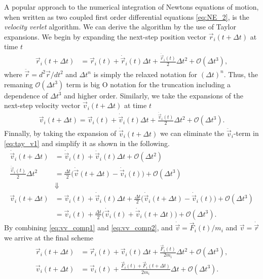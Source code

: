 A popular approach to the numerical integration of Newtons equations of motion, when written as two coupled first order differential equations \cref{eq:NE_2}, is the \textit{velocity verlet} algorithm. We can derive the algorithm by
the use of Taylor expansions. We begin by expanding the next-step position
vector $\vec{r}_i(t + \Delta t)$ at time $t$
\begin{align}
  \vec{r}_i(t + \Delta t) &= \vec{r}_i(t) + \dot{\vec{r}}_i(t) \Delta t + \frac{\ddot{\vec{r}}_i(t)}{2} \Delta t^2 + \mathcal{O}(\Delta t^3) \label{eq:vv_comp1},
\end{align}
where $\ddot{\vec{r}} = d^2\vec{r}/dt^2$ and $\Delta t^n$ is simply the relaxed
notation for $(\Delta t)^n$. Thus, the remaning $\mathcal{O}(\Delta t^3)$ term is big O notation for the truncation including a dependence of $\Delta t^3$ and higher order. Similarly, we take the expansions of the next-step
velocity vector $\vec{v}_i(t+\Delta t)$ at time $t$ 
\begin{align}
  \vec{v}_i(t+\Delta t) = \vec{v}_i(t) + \dot{\vec{v}}_i(t) \Delta t + \frac{\ddot{\vec{v}}_i(t)}{2}\Delta t^2 + \mathcal{O}(\Delta t^3).
  \label{eq:tay_v1}
\end{align}
Finnally, by taking the expansion of $\dot{\vec{v}}_i(t+\Delta t)$ we can
eliminate the $\ddot{\vec{v}}_i$-term in \cref{eq:tay_v1} and simplify it as
shown in the following.
\begin{align}
  \dot{\vec{v}}_i(t+\Delta t) &= \dot{\vec{v}}_i(t) + \ddot{\vec{v}}_i(t) \Delta t + \mathcal{O}(\Delta t^2) \nonumber \\
  \frac{\ddot{\vec{v}}_i(t)}{2}\Delta t^2 &= \frac{\Delta t}{2}\Big( \dot{\vec{v}}(t+\Delta t) - \dot{\vec{v}}_i(t)\Big) + \mathcal{O}(\Delta t^3) \nonumber \\
  &\Downarrow \nonumber \\
  \vec{v}_i(t+\Delta t) &= \vec{v}_i(t) + \dot{\vec{v}}_i(t) \Delta t + \frac{\Delta t}{2}\Big( \dot{\vec{v}}_i(t+\Delta t) - \dot{\vec{v}}_i(t)\Big) + \mathcal{O}(\Delta t^3) \nonumber \\
  &=  \vec{v}_i(t) + \frac{\Delta t}{2}\Big( \dot{\vec{v}}_i(t) +  \dot{\vec{v}}_i(t+\Delta t)\Big) + \mathcal{O}(\Delta t^3).
  \label{eq:vv_comp2}
\end{align}
By combining \cref{eq:vv_comp1} and \cref{eq:vv_comp2}, and $\dot{\vec{v}} = \vec{F}_i(t)/m_i$ and $\vec{v} = \dot{\vec{r}}$ we
arrive at the final scheme
\begin{align*}
  \vec{r}_i(t + \Delta t) &= \vec{r}_i(t) + \vec{v}_i(t) \Delta t + \frac{\vec{F}_i(t)}{2m_i}\Delta t^2 + \mathcal{O}(\Delta t^3), \\
  \vec{v}_i(t+\Delta t)  &= \vec{v}_i(t) + \frac{\vec{F}_i(t) + \vec{F}_i(t+\Delta t)}{2m_i}  \Delta t + \mathcal{O}(\Delta t^3).
\end{align*}
